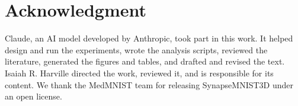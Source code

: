 \documentclass[conference]{IEEEtran}
\newif\ifanycitation
\begin{document}
\section*{Acknowledgment}

Claude, an AI model developed by Anthropic, took part in this work. It helped design and
run the experiments, wrote the analysis scripts, reviewed the literature, generated the
figures and tables, and drafted and revised the text. Isaiah R. Harville directed the
work, reviewed it, and is responsible for its content. We thank the MedMNIST team for
releasing SynapseMNIST3D under an open license.

\ifanycitation


\fi
\end{document}
